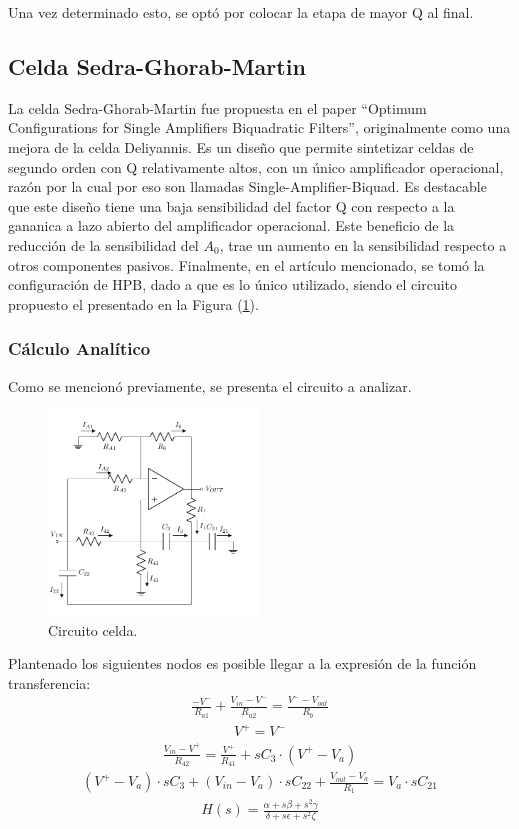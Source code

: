Una vez determinado esto, se optó por colocar la etapa de mayor Q al final.

\subsection{Celda Sedra-Ghorab-Martin}
La celda Sedra-Ghorab-Martin fue propuesta en el paper ``Optimum Configurations for Single Amplifiers Biquadratic Filters'', originalmente como una mejora de la celda Deliyannis. Es un diseño que permite sintetizar celdas de segundo orden con Q relativamente altos, con un único amplificador operacional, razón por la cual por eso son llamadas Single-Amplifier-Biquad. Es destacable que este diseño tiene una baja sensibilidad del factor Q con respecto a la gananica a lazo abierto del amplificador operacional. Este beneficio de la reducción de la sensibilidad del $A_0$, trae un aumento en la sensibilidad respecto a otros componentes pasivos. Finalmente, en el artículo mencionado, se tomó la configuración de HPB, dado a que es lo único utilizado, siendo el circuito propuesto el presentado en la Figura (\ref{fig:HPBSedrac}).

\subsubsection{Cálculo Analítico}
Como se mencionó previamente, se presenta el circuito a analizar.
\begin{figure}[H]
	\centering
	\includegraphics[width=0.5\textwidth]{Imagenes-Ej3/CircuitoDeGuido.pdf}
	\caption{Circuito celda.}
	\label{fig:HPBSedrac}
\end{figure}
Plantenado los siguientes nodos es posible llegar a la expresión de la función transferencia:
\begin{align}
\frac{-V^-}{R_{a1}}+\frac{V_{in}-V^-}{R_{a2}}=\frac{V^--V_{out}}{R_b}
\end{align}
\begin{align}
V^+=V^-
\end{align}
\begin{align}
\frac{V_{in}-V^+}{R_{42}}=\frac{V^+}{R_{41}}+sC_3\cdot (V^+-V_a)
\end{align}
\begin{align}
(V^+-V_a)\cdot sC_3 + (V_{in}-V_a)\cdot sC_{22}+\frac{V_{out}-V_a}{R_1}=V_a\cdot sC_{21}
\end{align}
\begin{align}
H(s)=
{\frac { \alpha +s \beta +{s}^{2} \gamma }{\delta+s \epsilon +{s}^{2} \zeta }
}
\end{align}


